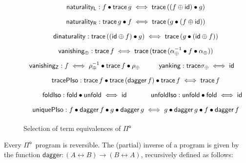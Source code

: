 \documentclass[runningheads,a4paper]{llncs}
\newcommand{\Pio}{\ensuremath{\mathsf{\Pi}^{\mathsf{o}}}}
\newcommand{\id}{\mathsf{id}}
\newcommand{\lr}{\longleftrightarrow}
\newcommand{\fold}{\mathsf{fold}}
\newcommand{\unfold}{\mathsf{unfold}}
\newcommand{\trace}{\ensuremath{\mathsf{trace}}}
\newcommand{\Z}{\mathsf{Z}}
\newcommand{\LR}{\iff}
\renewcommand{\dagger}{\mathsf{dagger}}
\begin{document}
\begin{figure}
\[
\arraycolsep=8pt\def\arraystretch{1.8}
\begin{array}{cc} %
\multicolumn{2}{c}{\mathsf{naturality_L} : f \bullet \trace\,g \LR \trace\,((f \oplus
  \id) \bullet g)} \\ 
\multicolumn{2}{c}{\mathsf{naturality_R} : \trace\,g \bullet f \LR \trace\,(g \bullet (f 
  \oplus \id))} \\  
\multicolumn{2}{c}{\mathsf{dinaturality} : \trace \,((\id \oplus f) \bullet g) \LR \trace
  \,(g \bullet (\id \oplus f))} \\
\multicolumn{2}{c}{\mathsf{vanishing_\oplus} : \trace \,f \LR \trace \,(\trace
  \,(\alpha_\oplus^{-1} \bullet f \bullet \alpha_\oplus))} \\ 
\mathsf{vanishing_\Z} : f \LR \rho_\oplus^{-1} \bullet \trace \,f
  \bullet \rho_\oplus 
&
\mathsf{yanking} : \trace \sigma_\oplus \LR \id
 \\
\multicolumn{2}{c}{\mathsf{tracePIso} : \trace\,f \bullet \trace\,(\dagger\,f)
  \bullet \trace\,f \LR \trace \,f} \\
\mathsf{foldIso} : \fold \bullet \unfold \LR \id 
&
\mathsf{unfoldIso} : \unfold \bullet \fold \LR \id
\\
\multicolumn{2}{c}{\mathsf{uniquePIso} : f \bullet \dagger \,f
  \bullet g \bullet \dagger \, g \LR g \bullet \dagger \,g
  \bullet f \bullet \dagger \, f}
\end{array}
\]
\caption{Selection of term equivalences of \Pio}
\label{fig:programequivs}
\end{figure}

Every \Pio\ program is reversible. The (partial) inverse of a program is given by
the function $\dagger : (A \lr B) \to (B \lr A)$, recursively defined
as follows:
\end{document}
